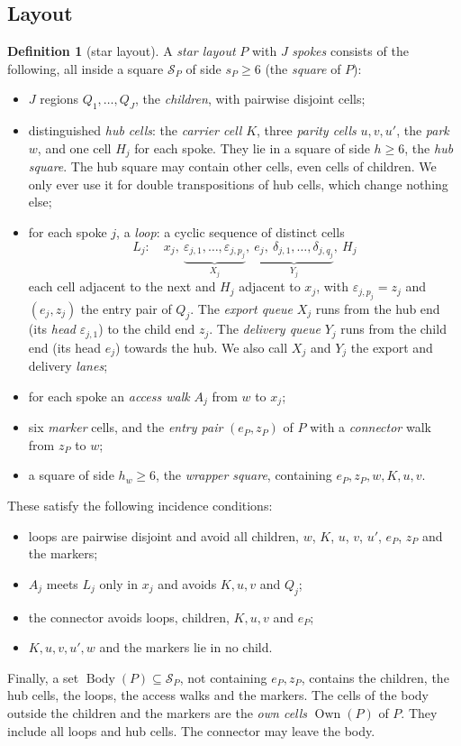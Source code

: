 \documentclass[11pt]{amsart}
\theoremstyle{definition}
\newtheorem{definition}[theorem]{Definition}
\newcommand{\Own}{\operatorname{Own}}
\begin{document}
\subsection{Layout}

\begin{definition}[star layout]\label{def:layout}
A \emph{star layout} $P$ with $J$ \emph{spokes} consists of the following, all inside a square $\mathcal S_P$ of side
$s_P\ge6$ (the \emph{square} of $P$):
\begin{itemize}[nosep]
\item $J$ regions $Q_1,\dots,Q_J$, the \emph{children}, with pairwise disjoint cells;
\item distinguished \emph{hub cells}: the \emph{carrier cell} $K$, three \emph{parity cells} $u,v,u'$, the \emph{park} $w$,
  and one cell $H_j$ for each spoke. They lie in a square of side $h\ge6$, the \emph{hub square}. The hub square may
  contain other cells, even cells of children. We only ever use it for double transpositions of hub cells, which
  change nothing else;
\item for each spoke $j$, a \emph{loop}: a cyclic sequence of distinct cells
  \[
  L_j:\quad x_j,\ \underbrace{\varepsilon_{j,1},\dots,\varepsilon_{j,p_j}}_{X_j},\ \underbrace{e_j,\ \delta_{j,1},\dots,\delta_{j,q_j}}_{Y_j},\ H_j
  \]
  each cell adjacent to the next and $H_j$ adjacent to $x_j$, with $\varepsilon_{j,p_j}=z_j$ and
  $(e_j,z_j)$ the entry pair of $Q_j$. The \emph{export queue} $X_j$ runs from the hub end (its \emph{head}
  $\varepsilon_{j,1}$) to the child end $z_j$. The \emph{delivery queue} $Y_j$ runs from the child end (its head $e_j$)
  towards the hub. We also call $X_j$ and $Y_j$ the export and delivery \emph{lanes};
\item for each spoke an \emph{access walk} $A_j$ from $w$ to $x_j$;
\item six \emph{marker} cells, and the \emph{entry pair} $(e_P,z_P)$ of $P$ with a \emph{connector} walk
  from $z_P$ to $w$;
\item a square of side $h_w\ge6$, the \emph{wrapper square}, containing $e_P,z_P,w,K,u,v$.
\end{itemize}
These satisfy the following incidence conditions:
\begin{itemize}[nosep]
\item loops are pairwise disjoint and avoid all children, $w$, $K$, $u$, $v$, $u'$, $e_P$, $z_P$ and the markers;
\item $A_j$ meets $L_j$ only in $x_j$ and avoids $K,u,v$ and $Q_j$;
\item the connector avoids loops, children, $K,u,v$ and $e_P$;
\item $K,u,v,u',w$ and the markers lie in no child.
\end{itemize}
Finally, a set $\operatorname{Body}(P)\subseteq\mathcal S_P$, not containing $e_P,z_P$, contains the children, the hub cells, the loops,
the access walks and the markers. The cells of the body outside the children and the markers are the \emph{own cells}
$\Own(P)$ of $P$. They include all loops and hub cells. The connector may leave the body.
\end{definition}
\end{document}

